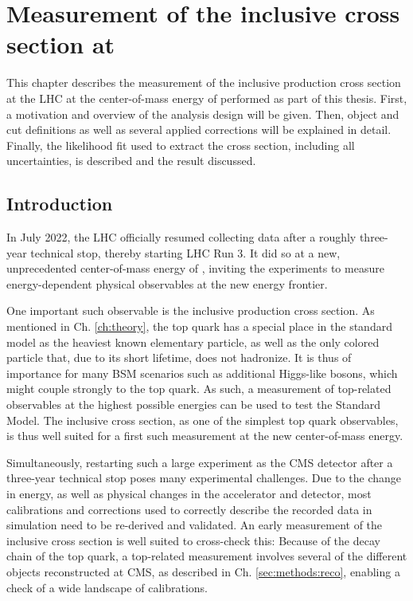 \chapter{Measurement of the inclusive \ttbartitle cross section at \texorpdfstring{\sqrtsRIII}{sqrt(s) = 13 TeV}}
\label{ch:ttxs}

This chapter describes the measurement of the inclusive \ttbar production cross section at the LHC at the center-of-mass energy of \sqrtsRIII performed as part of this thesis. First, a motivation and overview of the analysis design will be given. Then, object and cut definitions as well as several applied corrections will be explained in detail. Finally, the likelihood fit used to extract the cross section, including all uncertainties, is described and the result discussed.

\section{Introduction}



In July 2022, the LHC officially resumed collecting data after a roughly three-year technical stop, thereby starting LHC Run 3. It did so at a new, unprecedented center-of-mass energy of \sqrtsRIII, inviting the experiments to measure energy-dependent physical observables at the new energy frontier.

One important such observable is the inclusive \ttbar production cross section. As mentioned in Ch. \ref{ch:theory}, the top quark has a special place in the standard model as the heaviest known elementary particle, as well as the only colored particle that, due to its short lifetime, does not hadronize. It is thus of importance for many BSM scenarios such as additional Higgs-like bosons, which might couple strongly to the top quark. As such, a measurement of top-related observables at the highest possible energies can be used to test the Standard Model. The inclusive \ttbar cross section, as one of the simplest top quark observables, is thus well suited for a first such measurement at the new center-of-mass energy.

Simultaneously, restarting such a large experiment as the CMS detector after a three-year technical stop poses many experimental challenges. Due to the change in energy, as well as physical changes in the accelerator and detector, most calibrations and corrections used to correctly describe the recorded data in simulation need to be re-derived and validated. An early measurement of the inclusive \ttbar cross section is well suited to cross-check this: Because of the decay chain of the top quark, a top-related measurement involves several of the different objects reconstructed at CMS, as described in Ch. \ref{sec:methods:reco}, enabling a check of a wide landscape of calibrations.


